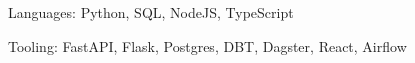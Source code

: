 


\begin{cvskills}


\cvskill
{Languages:} %
{Python, SQL, NodeJS, TypeScript} %


\cvskill
{Tooling:} %
{FastAPI, Flask, Postgres, DBT, Dagster, React, Airflow}


\end{cvskills}